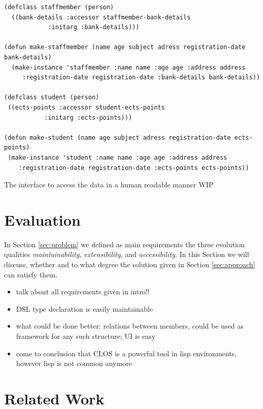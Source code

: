 \documentclass[oribibl]{llncs}
\begin{document}
\begin{listing}[]%
\begin{verbatim}
(defclass staffmember (person)
  ((bank-details :accessor staffmember-bank-details
            :initarg :bank-details)))

(defun make-staffmember (name age subject adress registration-date bank-details)
  (make-instance 'staffmember :name name :age age :address address
     :registration-date registration-date :bank-details bank-details))

(defclass student (person)
 ((ects-points :accessor student-ects-points
           :initarg :ects-points)))

(defun make-student (name age subject adress registration-date ects-points)
 (make-instance 'student :name name :age age :address address
    :registration-date registration-date :ects-points ects-points))

\end{verbatim}
\caption{The interface to access the data in a human readable manner WIP}
\label{lst:clossyntax}
\end{listing}


\section{Evaluation}
\label{sec:evaluation}

In Section \ref{sec:problem} we defined as main requirements the three  evolution qualities \emph{maintainability}, \emph{extensibility}, and \emph{accessibility}. In this Section we will discuss, whether and to what degree the solution given in Section \ref{sec:approach} can satisfy them.


\begin{itemize}
\item talk about all requirements given in intro!!
\item DSL type declaration is easily maintainable
\item what could be done better: relations between members, could be used as framework for any such structure; UI is easy 
\item come to conclusion that CLOS is a powerful tool in lisp environments, however lisp is not common anymore
\end{itemize}

\section{Related Work}
\label{sec:related}
\end{document}
